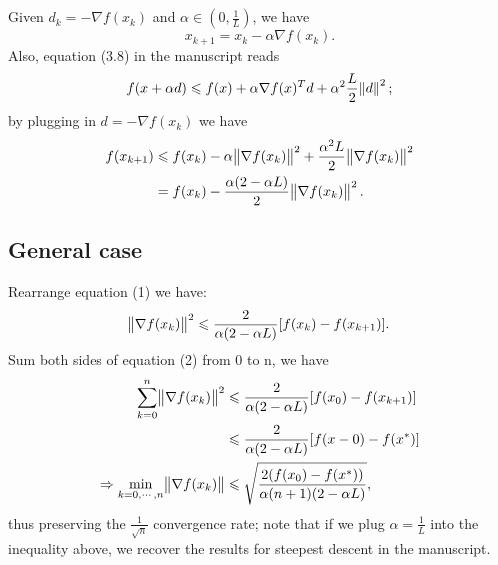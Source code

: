 \documentclass[11pt]{article}
\begin{document}
\maketitle
\section{}
Given $d_k = -\nabla f(x_k)$ and $\alpha \in (0,\frac1L)$, we have $$x_{k+1} = x_k - \alpha \nabla f(x_k).$$ Also, equation (3.8) in the manuscript reads $$f(x + \alpha d)\leqslant f(x) +\alpha \nabla f(x)^Td + \alpha^2\frac L2\norm{d}^2;$$
by plugging in $d = -\nabla f(x_k)$ we have 
\begin{equation}\begin{split} 
f(x_{k+1}) &\leqslant f(x_k) - \alpha \norm{\nabla f(x_k)}^2 + \frac{\alpha^2L}2\norm{\nabla f(x_k)}^2 \\
&= f(x_k) - \frac{\alpha(2-\alpha L)}2\norm{\nabla f(x_k)}^2.
\end{split}\end{equation} 
\subsection{General case}
Rearrange equation (1) we have:
\begin{equation}\begin{split}\norm{\nabla f(x_k)}^2\leqslant \frac2{\alpha(2-\alpha L)}[f(x_k) - f(x_{k+1})]. \end{split}\end{equation} 
Sum both sides of equation (2) from 0 to n, we have
\begin{equation}\begin{split}
\sum_{k=0}^{n} \norm{\nabla f(x_k)}^2 &\leqslant \frac2{\alpha(2-\alpha L)}[f(x_0) - f(x_{k+1})]\\
&\leqslant \frac2{\alpha(2-\alpha L)} [f(x-0) - f(x^*)] \\
\Rightarrow \min_{k = 0,\cdots, n}\norm{\nabla f(x_k)} &\leqslant \sqrt{\frac{2(f(x_0) - f(x^*))}{\alpha(n+1)(2-\alpha L)}},
\end{split}\end{equation}  
thus preserving the $\frac1{\sqrt{n}}$ convergence rate; note that if we plug $\alpha = \frac1L$ into the inequality above, we recover the results for steepest descent in the manuscript.
\end{document}
